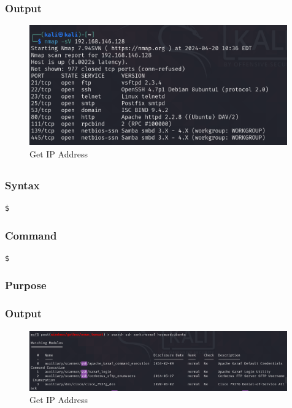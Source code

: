 \documentclass[11pt]{article}
\begin{document}
\subsubsection*{Output}
\begin{figure}[H]
    \centering
    \includegraphics[width=0.99\textwidth]{a3_ss (28).png}
    \caption{Get IP Address}
    \label{fig:1}
\end{figure}
\subsection{}

\subsubsection*{Syntax}
\begin{verbatim}
$
\end{verbatim}

\subsubsection*{Command}
\begin{verbatim}
$
\end{verbatim}

\subsubsection*{Purpose}

\subsubsection*{Output}
\begin{figure}[H]
    \centering
    \includegraphics[width=0.99\textwidth]{a3_ss (29).png}
    \caption{Get IP Address}
    \label{fig:1}
\end{figure}
\end{document}
